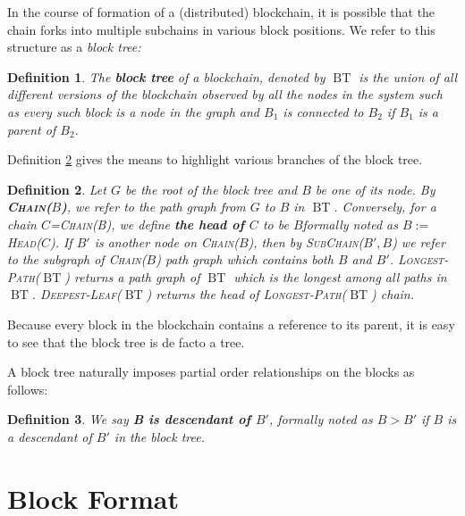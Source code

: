 \documentclass{article}
\newcommand{\assign}{:=}
\newcommand{\tmem}[1]{{\em #1\/}}
\newcommand{\tmname}[1]{\textsc{#1}}
\newcommand{\tmop}[1]{\ensuremath{\operatorname{#1}}}
\newcommand{\tmstrong}[1]{\textbf{#1}}
\newcommand{\tmtextbf}[1]{{\bfseries{#1}}}
\newcommand{\tmtextit}[1]{{\itshape{#1}}}
\newcommand{\tmtextsc}[1]{{\scshape{#1}}}
\newtheorem{definition}{Definition}
\providecommand{\tmem}[1]{\tmtextit{#1}}
\providecommand{\tmname}[1]{\tmtextsc{#1}}
\providecommand{\tmop}[1]{\ensuremath{\mathrm{#1}}}
\providecommand{\tmstrong}[1]{\tmtextbf{#1}}
\providecommand{\tmtextbf}[1]{\tmtextbf{#1}}
\providecommand{\tmtextit}[1]{\tmtextit{#1}}
\newtheorem{definition}{Definition}
\begin{document}
In the course of formation of a (distributed) blockchain, it is possible that
the chain forks into multiple subchains in various block positions. We refer
to this structure as a {\tmem{block tree:}}

\begin{definition}
  \label{defn-block-tree}The {\tmstrong{block tree}} of a blockchain, denoted
  by $\tmop{BT}$ is the union of all different versions of the blockchain
  observed by all the nodes in the system such as every such block is a node
  in the graph and $B_1$ is connected to $B_2$ if $B_1$ is a parent of $B_2$.
\end{definition}

Definition \ref{defn-chain-subchain} gives the means to highlight various
branches of the block tree.

\begin{definition}
  \label{defn-chain-subchain}Let $G$ be the root of the block tree and $B$ be
  one of its node. By {\tmname{{\tmstrong{Chain($B$)}},}} we refer to the path
  graph from $G$ to $B$ in $\tmop{BT}$. Conversely, for a chain
  $C$={\tmname{Chain(B)}}, we define {\tmstrong{the head of $C$}} to be
  $B${\versionboth{ }{, }}formally noted as $B \assign${\tmname{Head($C$)}}.
  If $B'$ is another node on {\tmname{Chain($B$)}}, then by
  {\tmname{SubChain($B', B$)}} we refer to the subgraph of
  {\tmname{Chain($B$)}} path graph which contains both $B$ and $B'$.
  {\tmname{Longest-Path($\tmop{BT}$)}} returns a path graph of $\tmop{BT}$
  which is the longest among all paths in $\tmop{BT}$.
  {\tmname{Deepest-Leaf($\tmop{BT}$)}} returns the head of
  {\tmname{Longest-Path($\tmop{BT}$)}} chain.
\end{definition}

Because every block in the blockchain contains a reference to its parent, it
is easy to see that the block tree is de facto a tree.

A block tree naturally imposes partial order relationships on the blocks as
follows:

\begin{definition}
  We say {\tmstrong{B is descendant of $B'$}}, formally noted as {\tmstrong{$B
  > B'$}} if $B$ is a descendant of $B'$ in the block tree.
\end{definition}

\section{Block Format}
\end{document}

